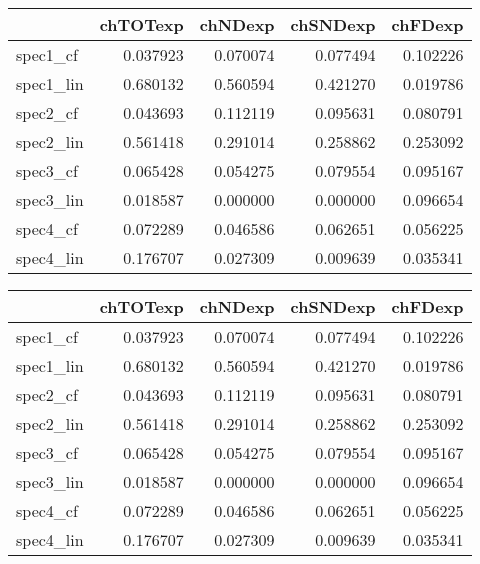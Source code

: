 \begin{tabular}{lrrrr}
\toprule
{} &  chTOTexp &   chNDexp &  chSNDexp &   chFDexp \\
\midrule
spec1\_cf  &  0.037923 &  0.070074 &  0.077494 &  0.102226 \\
spec1\_lin &  0.680132 &  0.560594 &  0.421270 &  0.019786 \\
spec2\_cf  &  0.043693 &  0.112119 &  0.095631 &  0.080791 \\
spec2\_lin &  0.561418 &  0.291014 &  0.258862 &  0.253092 \\
spec3\_cf  &  0.065428 &  0.054275 &  0.079554 &  0.095167 \\
spec3\_lin &  0.018587 &  0.000000 &  0.000000 &  0.096654 \\
spec4\_cf  &  0.072289 &  0.046586 &  0.062651 &  0.056225 \\
spec4\_lin &  0.176707 &  0.027309 &  0.009639 &  0.035341 \\
\bottomrule
\end{tabular}
\begin{tabular}{lrrrr}
\toprule
{} &  chTOTexp &   chNDexp &  chSNDexp &   chFDexp \\
\midrule
spec1\_cf  &  0.037923 &  0.070074 &  0.077494 &  0.102226 \\
spec1\_lin &  0.680132 &  0.560594 &  0.421270 &  0.019786 \\
spec2\_cf  &  0.043693 &  0.112119 &  0.095631 &  0.080791 \\
spec2\_lin &  0.561418 &  0.291014 &  0.258862 &  0.253092 \\
spec3\_cf  &  0.065428 &  0.054275 &  0.079554 &  0.095167 \\
spec3\_lin &  0.018587 &  0.000000 &  0.000000 &  0.096654 \\
spec4\_cf  &  0.072289 &  0.046586 &  0.062651 &  0.056225 \\
spec4\_lin &  0.176707 &  0.027309 &  0.009639 &  0.035341 \\
\bottomrule
\end{tabular}
